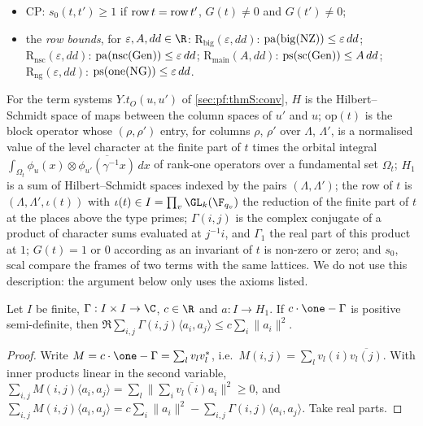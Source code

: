 \begin{definition}
\begin{itemize}
$\thmSrow t\ne\thmSrow t'$;
\item $\mathrm{CP}$: $s_0(t,t')\ge1$ if $\operatorname{row} t=\operatorname{row} t'$, $G(t)\ne0$ and $G(t')\ne0$;
\item the \emph{row bounds}, for $\varepsilon,A,dd\in\R$: $\mathrm{R}_{\mathrm{big}}(\varepsilon,dd)$:
$\operatorname{pa}(\mathrm{big}(\mathrm{NZ}))\le\varepsilon\,dd$; $\mathrm{R}_{\mathrm{nsc}}(\varepsilon,dd)$:
$\operatorname{pa}(\mathrm{nsc}(\mathrm{Gen}))\le\varepsilon\,dd$; $\mathrm{R}_{\mathrm{main}}(A,dd)$: $\operatorname{ps}(\mathrm{sc}(\mathrm{Gen}))\le A\,dd$;
$\mathrm{R}_{\mathrm{ng}}(\varepsilon,dd)$: $\operatorname{ps}(\mathrm{one}(\mathrm{NG}))\le\varepsilon\,dd$.
\end{itemize}
\end{definition}

For the term systems $Y.t_O(u,u')$ of \cref{sec:pf:thmS:conv}, $H$ is the Hilbert--Schmidt space of maps between the
column spaces of $u'$ and $u$; $\mathrm{op}(t)$ is the block operator whose $(\rho,\rho')$ entry, for columns $\rho$,
$\rho'$ over $\Lambda$, $\Lambda'$, is a normalised value of the level character at the finite part of $t$ times the
orbital integral $\int_{\Omega_t}\phi_u(x)\otimes\overline{\phi_{u'}(\gamma^{-1}x)}\,dx$ of rank-one operators over a
fundamental set $\Omega_t$; $H_1$ is a sum of Hilbert--Schmidt spaces indexed by the pairs $(\Lambda,\Lambda')$; the row
of $t$ is $(\Lambda,\Lambda',\iota(t))$ with $\iota(t)\in I=\prod_v\GL_k(\F_{q_v})$ the reduction of the finite part of
$t$ at the places above the type primes; $\Gamma(i,j)$ is the complex conjugate of a product of character sums
evaluated at $j^{-1}i$, and $\Gamma_1$ the real part of this product at $1$; $G(t)=1$ or $0$ according as an invariant
of $t$ is non-zero or zero; and $s_0$, $\mathrm{scal}$ compare the frames of two terms with the same lattices. We do not
use this description: the argument below only uses the axioms listed.

\begin{lemma}\label{pf:thmS:gram}
Let $I$ be finite, $\Gamma:I\times I\to\C$, $c\in\R$ and $a:I\to H_1$. If $c\cdot\one-\Gamma$ is positive
semi-definite, then $\Re\sum_{i,j}\Gamma(i,j)\langle a_i,a_j\rangle\le c\sum_i\|a_i\|^2$.
\end{lemma}

\begin{proof}
Write $M=c\cdot\one-\Gamma=\sum_lv_lv_l^*$, i.e.\ $M(i,j)=\sum_lv_l(i)\overline{v_l(j)}$. With inner products linear in
the second variable, $\sum_{i,j}M(i,j)\langle a_i,a_j\rangle=\sum_l\|\sum_i\overline{v_l(i)}a_i\|^2\ge0$, and
$\sum_{i,j}M(i,j)\langle a_i,a_j\rangle=c\sum_i\|a_i\|^2-\sum_{i,j}\Gamma(i,j)\langle a_i,a_j\rangle$. Take real parts.
\end{proof}

